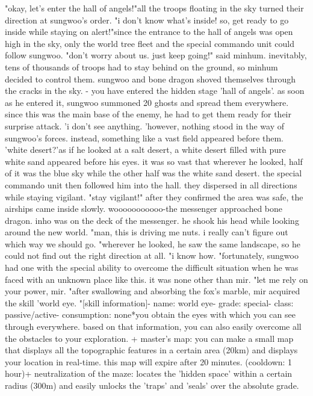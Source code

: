 "okay, let's enter the hall of angels!"all the troops floating in the sky turned their direction at sungwoo's order.
"i don't know what's inside! so, get ready to go inside while staying on alert!"since the entrance to the hall of angels was open high in the sky, only the world tree fleet and the special commando unit could follow sungwoo.
 "don't worry about us.
 just keep going!" said minhum.
 inevitably, tens of thousands of troops had to stay behind on the ground, so minhum decided to control them.
sungwoo and bone dragon shoved themselves through the cracks in the sky.
- you have entered the hidden stage 'hall of angels'.
as soon as he entered it, sungwoo summoned 20 ghosts and spread them everywhere.
since this was the main base of the enemy, he had to get them ready for their surprise attack.
 'i don't see anything.
'however, nothing stood in the way of sungwoo's forces.
 instead, something like a vast field appeared before them.
'white desert?'as if he looked at a salt desert, a white desert filled with pure white sand appeared before his eyes.
 it was so vast that wherever he looked, half of it was the blue sky while the other half was the white sand desert.
 the special commando unit then followed him into the hall.
 they dispersed in all directions while staying vigilant.
"stay vigilant!"
after they confirmed the area was safe, the airships came inside slowly.
 wooooooooooo-the messenger approached bone dragon.
 inho was on the deck of the messenger.
 he shook his head while looking around the new world.
"man, this is driving me nuts.
 i really can't figure out which way we should go.
"wherever he looked, he saw the same landscape, so he could not find out the right direction at all.
"i know how.
"fortunately, sungwoo had one with the special ability to overcome the difficult situation when he was faced with an unknown place like this.
 it was none other than mir.
"let me rely on your power, mir.
"after swallowing and absorbing the fox's marble, mir acquired the skill 'world eye.
"[skill information]- name: world eye- grade: special- class: passive/active- consumption: none*you obtain the eyes with which you can see through everywhere.
 based on that information, you can also easily overcome all the obstacles to your exploration.
+ master's map: you can make a small map that displays all the topographic features in a certain area (20km) and displays your location in real-time.
 this map will expire after 20 minutes.
 (cooldown: 1 hour)+ neutralization of the maze: locates the 'hidden space' within a certain radius (300m) and easily unlocks the 'traps' and 'seals' over the absolute grade.
